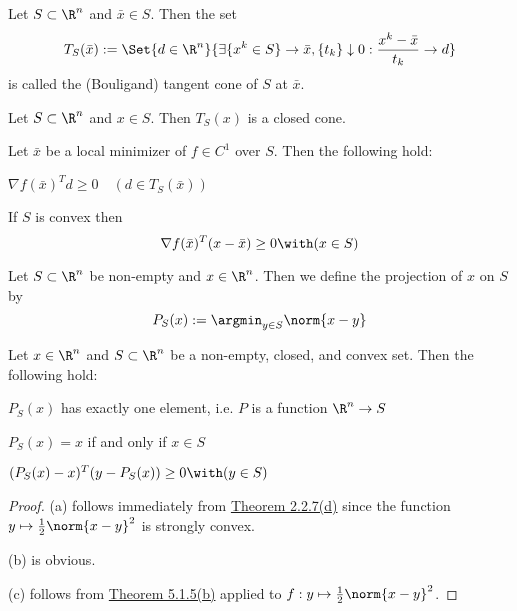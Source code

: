 \label{add7a4b}

Let $S\subset\R^n$ and $\bar x\in S$. Then the set
$$
  T_S(\bar x):=\Set{d\in\R^n}
  {\exists\{x^k\in S\}\to\bar x,\{t_k\}\downarrow0:\frac{x^k-\bar x}{t_k}\to d}
$$
is called the (Bouligand) tangent cone of $S$ at $\bar x$.

\label{fe814cc}

Let $S\subset\R^n$ and $x\in S$. Then $T_S(x)$ is a closed cone.

\label{c8e5836}

Let $\bar x$ be a local minimizer of $f\in C^1$ over $S$. Then the following
hold:
\begin{enumerata}
  \item $\nabla f(\bar x)^Td\geq0\quad(d\in T_S(\bar x))$
  \item If $S$ is convex then
  $$
    \nabla f(\bar x)^T(x-\bar x)\geq 0\with(x\in S)
  $$
\end{enumerata}

\label{fb41457}

Let $S\subset\R^n$ be non-empty and $x\in\R^n$. Then we define the projection
of $x$ on $S$ by
$$
  P_S(x):=\argmin_{y\in S}\norm{x-y}
$$

\label{ce30ae7}

Let $x\in\R^n$ and $S\subset\R^n$ be a non-empty, closed, and convex set. Then
the following hold:
\begin{enumerata}
  \item $P_S(x)$ has exactly one element, i.e. $P$ is a function
  $\R^n\to S$
  \item $P_S(x)=x$ if and only if $x\in S$
  \item $(P_S(x)-x)^T(y-P_S(x))\geq0\with(y\in S)$
\end{enumerata}

\begin{proof}
  (a) follows immediately from \href{f546fc9}{Theorem 2.2.7(d)} since
  the function $y\mapsto\frac12\norm{x-y}^2$ is strongly convex.

  (b) is obvious.

  (c) follows from \href{c8e5836}{Theorem 5.1.5(b)} applied to
  $f:y\mapsto\frac12\norm{x-y}^2$.
\end{proof}

\label{d2dff14}


